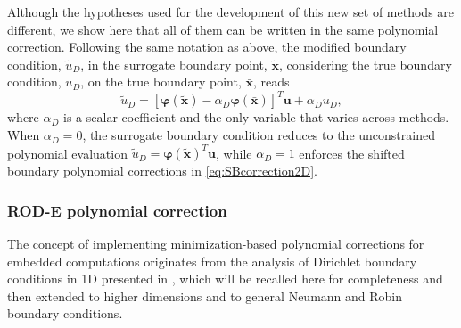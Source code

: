 \documentclass{article}
\renewcommand{\phi}{\varphi}
\begin{document}
Although the hypotheses used for the development of this new set of methods are different, we show here that all of them can be written in the same polynomial correction. Following the same notation as above, the modified boundary condition, $\tilde u_D$, in the surrogate boundary point, $\tilde{\boldsymbol{x}}$, considering the true boundary condition, $u_D$, on the true boundary point, $\bar{\boldsymbol{x}}$, reads
%
\begin{equation}\label{eq:generalPC}
    \tilde u_D = [\boldsymbol{\phi}(\tilde{\boldsymbol{x}}) - \alpha_D \boldsymbol{\phi}(\bar{\boldsymbol{x}})]^T \boldsymbol{u} + \alpha_D u_D, 
\end{equation}
%
where $\alpha_D$ is a scalar coefficient and the only variable that varies across methods. When $\alpha_D = 0$, the surrogate boundary condition reduces to the unconstrained polynomial evaluation $\tilde u_D = \boldsymbol{\phi}(\tilde{\boldsymbol{x}})^T \boldsymbol{u}$, while $\alpha_D = 1$ enforces the shifted boundary polynomial corrections in \eqref{eq:SBcorrection2D}.


\subsubsection{ROD-E polynomial correction}

The concept of implementing minimization-based polynomial corrections for embedded computations originates from the analysis of Dirichlet boundary conditions in 1D presented in \cite{ciallella2025minimization}, which will be recalled here for completeness and then extended to higher dimensions and to general Neumann and Robin boundary conditions.
\end{document}
